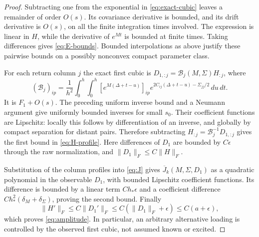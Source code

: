 \documentclass[11pt,a4paper]{amsart}
\theoremstyle{plain}
\theoremstyle{definition}
\theoremstyle{remark}
\begin{document}
\begin{proof}
Subtracting one from the exponential in \eqref{eq:exact-cubic} leaves a
remainder of order $O(s)$. Its covariance derivative is bounded, and its
drift derivative is $O(s)$, on all the finite integration times involved.
The expression is linear in $H$, while the derivative of $e^{Mt}$ is
bounded at finite times. Taking differences gives \eqref{eq:E-bounds}.
Bounded interpolations as above justify these pairwise bounds on a
possibly nonconvex compact parameter class.

For each return column $j$ the exact first cubic is
$D_{1,:j}=\mathcal B_j(M,\Sigma)H_{:j}$, where
\begin{equation}\label{eq:profile-matrix}
 (\mathcal B_j)_{ip}=\frac1{h^2}\int_0^h\!\int_0^h
 [e^{M(\Delta+t-u)}]_{ip}
 e^{2C_{ij}(\Delta+t-u)-\Sigma_{jj}/2}\,du\,dt.
\end{equation}
It is $F_1+O(s)$. The preceding uniform inverse bound and a Neumann
argument give uniformly bounded inverses for small $s_0$. Their coefficient
functions are Lipschitz: locally this follows by differentiation of an
inverse, and globally by compact separation for distant pairs. Therefore
subtracting $H_{:j}=\mathcal B_j^{-1}D_{1,:j}$ gives the first bound in
\eqref{eq:H-profile}. Here differences of $D_1$ are bounded by $C\epsilon$
through the raw normalization, and $\|D_1\|_F\le C\|H\|_F$.

Substitution of the column profiles into \eqref{eq:J} gives
$\overline J_k(M,\Sigma,D_1)$ as a quadratic polynomial in the observable
$D_1$, with bounded Lipschitz coefficient functions. Its difference is
bounded by a linear term $Ch_*\epsilon$ and a coefficient difference
$Ch_*^2(\delta_M+\delta_\Sigma)$, proving the second bound.
Finally
\[
 \|H'\|_F\le C\|D_1'\|_F
 \le C(\|D_1\|_F+\epsilon)\le C(a+\epsilon),
\]
which proves \eqref{eq:amplitude}. In particular, an arbitrary alternative
loading is controlled by the observed first cubic, not assumed known or
excited.
\end{proof}
\end{document}
